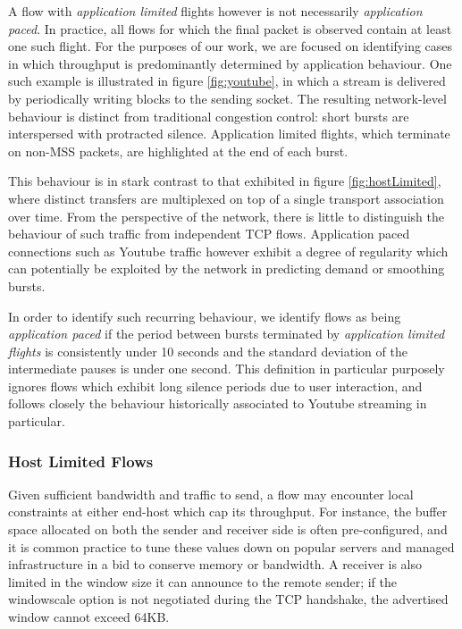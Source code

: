A flow with \emph{application limited} flights however is not necessarily \emph{application paced}. In practice, all flows for which the final packet is observed contain at least one such flight.
For the purposes of our work, we are focused on identifying cases in which throughput is predominantly determined by application behaviour.
One such example is illustrated in figure \ref{fig:youtube}, in which a stream is delivered by periodically writing blocks to the sending socket.
The resulting network-level behaviour is distinct from traditional congestion control: short bursts are interspersed with protracted silence.
Application limited flights, which terminate on non-MSS packets, are highlighted at the end of each burst.

This behaviour is in stark contrast to that exhibited in figure \ref{fig:hostLimited}, where distinct transfers are multiplexed on top of a single transport association over time.
From the perspective of the network, there is little to distinguish the behaviour of such traffic from independent TCP flows.
Application paced connections such as Youtube traffic however exhibit a degree of regularity which can potentially be exploited by the network in predicting demand or smoothing bursts.

In order to identify such recurring behaviour, we identify flows as being \emph{application paced} if the period between bursts terminated by \emph{application limited flights} is consistently under 10 seconds and the standard deviation of the intermediate pauses is under one second.
This definition in particular purposely ignores flows which exhibit long silence periods due to user interaction, and follows closely the behaviour historically associated to Youtube streaming in particular.

\subsubsection{Host Limited Flows}
\label{sssec:host}

Given sufficient bandwidth and traffic to send, a flow may encounter local constraints at either end-host which cap its throughput. 
For instance, the buffer space allocated on both the sender and receiver side is often pre-configured, and it is common practice to tune these values down on popular servers and managed infrastructure in a bid to conserve memory or bandwidth.
A receiver is also limited in the window size it can announce to the remote sender; if the windowscale option \cite{jacobson1992tcp} is not negotiated during the TCP handshake, the advertised window cannot exceed 64KB.

